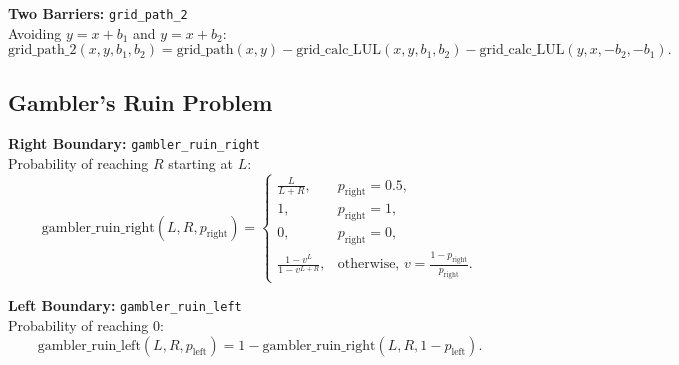     \textbf{Two Barriers:} \texttt{grid\_path\_2} \\
    Avoiding $y=x+b_1$ and $y=x+b_2$:
    \[
    \text{grid\_path\_2}(x, y, b_1, b_2) = \text{grid\_path}(x, y) - \text{grid\_calc\_LUL}(x, y, b_1, b_2) - \text{grid\_calc\_LUL}(y, x, -b_2, -b_1).
    \]

    \subsection{Gambler's Ruin Problem}
    \textbf{Right Boundary:} \texttt{gambler\_ruin\_right} \\
    Probability of reaching $R$ starting at $L$:
    \[
    \text{gambler\_ruin\_right}(L, R, p_{\text{right}}) =
    \begin{cases}
    \frac{L}{L+R}, & p_{\text{right}} = 0.5, \\
    1, & p_{\text{right}} = 1, \\
    0, & p_{\text{right}} = 0, \\
    \frac{1 - v^L}{1 - v^{L+R}}, & \text{otherwise, } v = \frac{1-p_{\text{right}}}{p_{\text{right}}}.
    \end{cases}
    \]

    \textbf{Left Boundary:} \texttt{gambler\_ruin\_left} \\
    Probability of reaching $0$:
    \[
    \text{gambler\_ruin\_left}(L, R, p_{\text{left}}) = 1 - \text{gambler\_ruin\_right}(L, R, 1-p_{\text{left}}).
    \]